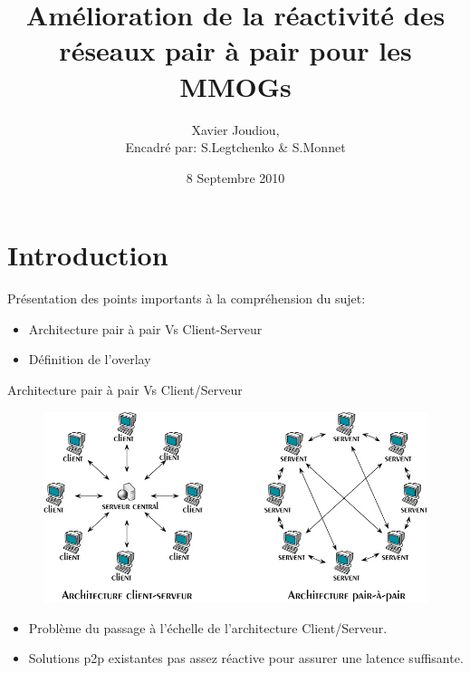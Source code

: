 \documentclass{beamer}
\title{Amélioration de la réactivité des réseaux pair à pair pour les MMOGs}
\author{Xavier Joudiou,\\\tiny{Encadré par: S.Legtchenko \& S.Monnet}}\institute{Université Paris VI, Master SAR}
\date{8 Septembre 2010}
\begin{document}
  \begin{frame}
  \maketitle
  \end{frame}


  \begin{frame}
  \tableofcontents
  \end{frame}

  \section{Introduction}
  \begin{frame}
  	Présentation des points importants à la compréhension du sujet:\\
	\begin{itemize}
		\item Architecture pair à pair Vs Client-Serveur\\
		\item Définition de l'overlay\\
	\end{itemize}
  \end{frame}

  \begin{frame}
	Architecture pair à pair Vs Client/Serveur\\
	\begin{figure}
	\includegraphics[scale=0.28]{./Ressources/Images/p2p-85145.png}\\
        \label{P2PvsClServ}
        \end{figure}
	\begin{itemize}
		\item Problème du passage à l'échelle de l'architecture Client/Serveur.\\
		\item Solutions p2p existantes pas assez réactive pour assurer une latence suffisante.\\
	\end{itemize}
  \end{frame}
  
\end{document}
